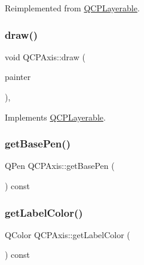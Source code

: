 Reimplemented from \mbox{\hyperlink{class_q_c_p_layerable_ae546370644a5551c76af739afc008bee}{Q\+C\+P\+Layerable}}.

\mbox{\label{class_q_c_p_axis_ac15ebb4225ca5212d8e5fffae481bc9b}} 
\subsubsection{\texorpdfstring{draw()}{draw()}}
{\footnotesize\ttfamily void Q\+C\+P\+Axis\+::draw (\begin{DoxyParamCaption}\item[{\mbox{\hyperlink{class_q_c_p_painter}{Q\+C\+P\+Painter}} $\ast$}]{painter }\end{DoxyParamCaption})\hspace{0.3cm}{\ttfamily [protected]}, {\ttfamily [virtual]}}



Implements \mbox{\hyperlink{class_q_c_p_layerable_aecf2f7087482d4b6a78cb2770e5ed12d}{Q\+C\+P\+Layerable}}.

\mbox{\label{class_q_c_p_axis_a8cd3764c6a4ce9c3d7d913e81cad0a50}} 
\subsubsection{\texorpdfstring{getBasePen()}{getBasePen()}}
{\footnotesize\ttfamily Q\+Pen Q\+C\+P\+Axis\+::get\+Base\+Pen (\begin{DoxyParamCaption}{ }\end{DoxyParamCaption}) const\hspace{0.3cm}{\ttfamily [protected]}}

\mbox{\label{class_q_c_p_axis_ae914abd56afa570cb9f2ab50e59c0f0e}} 
\subsubsection{\texorpdfstring{getLabelColor()}{getLabelColor()}}
{\footnotesize\ttfamily Q\+Color Q\+C\+P\+Axis\+::get\+Label\+Color (\begin{DoxyParamCaption}{ }\end{DoxyParamCaption}) const\hspace{0.3cm}{\ttfamily [protected]}}

